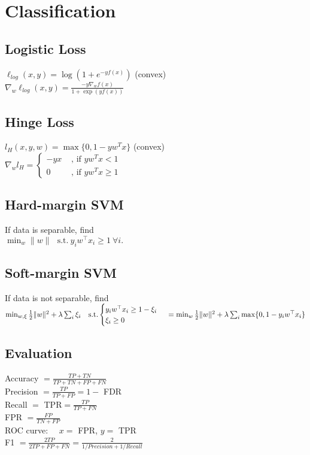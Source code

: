 \section*{Classification}
\subsection*{Logistic Loss}
$\ell_{log}(x,y) = \log(1+e^{-yf(x)})$ (convex)\\
$\nabla_w \ell_{log}(x,y) = \frac{-y\nabla_w f(x)}{1+\exp(yf(x))} $

\subsection*{Hinge Loss}
$l_H(x,y,w) = \max \{0,1-y w^T x\}$ (convex)\\
$\nabla_w l_H = \begin{cases}
    -y x&\text{ , if $yw^T x<1$}\\
	0 &\text{ , if $y w^T x \geq 1$}
\end{cases}$

\subsection*{Hard-margin SVM}
If data is separable, find \\
$\min_w\|w\| \ \ \ \text{s.t.} \ y_iw^\top x_i\geq 1 \ \forall i.$\\

\subsection*{Soft-margin SVM}
If data is not separable, find \\
$\min_{w,\xi}\frac{1}{2}\|w\|^2  +\lambda\sum_i\xi_i\ \ \ 
\text{s.t.} \begin{cases}
    y_iw^\top x_i\geq 1-\xi_i\\
    \xi_i\geq0
\end{cases}\\
=\min_w\frac{1}{2}\|w\|^2+\lambda\sum_i\max \{0,1-y_i w^\top x_i\}$


\subsection*{Evaluation}
Accuracy $=\frac{TP+TN}{TP+TN+FP+FN}$\\
Precision $=\frac{TP}{TP+FP}= 1-$ FDR\\
Recall $=$ TPR$ =\frac{TP}{TP+FN}$\\
FPR $=\frac{FP}{TN+FP}$\\
ROC curve: \ \ $x=$ FPR, $y=$ TPR\\
F1 $=\frac{2TP}{2TP+FP+FN}=\frac{2}{1/Precision+1/Recall}$\\